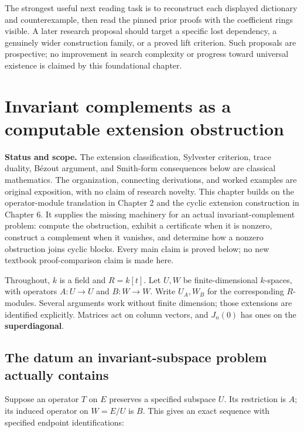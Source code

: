 \documentclass[
  11pt,
]{article}
\begin{document}
The strongest useful next reading task is to reconstruct each displayed
dictionary and counterexample, then read the pinned prior proofs with
the coefficient rings visible. A later research proposal should target a
specific lost dependency, a genuinely wider construction family, or a
proved lift criterion. Such proposals are prospective; no improvement in
search complexity or progress toward universal existence is claimed by
this foundational chapter.

\section{Invariant complements as a computable extension
obstruction}\label{invariant-complements-as-a-computable-extension-obstruction}

\textbf{Status and scope.} The extension classification, Sylvester
criterion, trace duality, Bézout argument, and Smith-form consequences
below are classical mathematics. The organization, connecting
derivations, and worked examples are original exposition, with no claim
of research novelty. This chapter builds on the operator-module
translation in Chapter 2 and the cyclic extension construction in
Chapter 6. It supplies the missing machinery for an actual
invariant-complement problem: compute the obstruction, exhibit a
certificate when it is nonzero, construct a complement when it vanishes,
and determine how a nonzero obstruction joins cyclic blocks. Every main
claim is proved below; no new textbook proof-comparison claim is made
here.

Throughout, \(k\) is a field and \(R=k[t]\). Let \(U,W\) be
finite-dimensional \(k\)-spaces, with operators \(A:U\to U\) and
\(B:W\to W\). Write \(U_A,W_B\) for the corresponding \(R\)-modules.
Several arguments work without finite dimension; those extensions are
identified explicitly. Matrices act on column vectors, and \(J_n(0)\)
has ones on the \textbf{superdiagonal}.

\subsection{The datum an invariant-subspace problem actually
contains}\label{the-datum-an-invariant-subspace-problem-actually-contains}

Suppose an operator \(T\) on \(E\) preserves a specified subspace \(U\).
Its restriction is \(A\); its induced operator on \(W=E/U\) is \(B\).
This gives an exact sequence with specified endpoint identifications:
\end{document}
